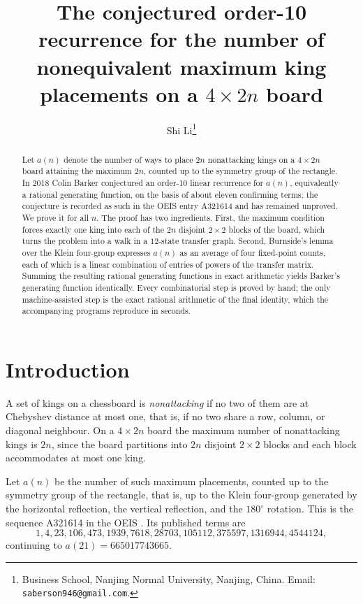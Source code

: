\documentclass[12pt]{article}
\theoremstyle{definition}
\begin{document}
\title{The conjectured order-10 recurrence for the number of
nonequivalent maximum king placements on a $4 \times 2n$ board}

\author{Shi Li\thanks{Business School, Nanjing Normal University, Nanjing,
China. Email: \texttt{saberson946@gmail.com}.}}

\date{}

\maketitle

\begin{abstract}
Let $a(n)$ denote the number of ways to place $2n$ nonattacking kings on a
$4 \times 2n$ board attaining the maximum $2n$, counted up to the symmetry
group of the rectangle. In 2018 Colin Barker conjectured an order-10 linear
recurrence for $a(n)$, equivalently a rational generating function, on the
basis of about eleven confirming terms; the conjecture is recorded as such in
the OEIS entry A321614 and has remained unproved. We prove it for all $n$. The
proof has two ingredients. First, the maximum condition forces exactly one king
into each of the $2n$ disjoint $2 \times 2$ blocks of the board, which turns the
problem into a walk in a $12$-state transfer graph. Second, Burnside's lemma
over the Klein four-group expresses $a(n)$ as an average of four fixed-point
counts, each of which is a linear combination of entries of powers of the
transfer matrix. Summing the resulting rational generating functions in exact
arithmetic yields Barker's generating function identically. Every combinatorial
step is proved by hand; the only machine-assisted step is the exact rational
arithmetic of the final identity, which the accompanying programs reproduce in
seconds.
\end{abstract}

\section{Introduction}

A set of kings on a chessboard is \emph{nonattacking} if no two of them are at
Chebyshev distance at most one, that is, if no two share a row, column, or
diagonal neighbour. On a $4 \times 2n$ board the maximum number of nonattacking
kings is $2n$, since the board partitions into $2n$ disjoint $2 \times 2$ blocks
and each block accommodates at most one king.

Let $a(n)$ be the number of such maximum placements, counted up to the
symmetry group of the rectangle, that is, up to the Klein four-group generated
by the horizontal reflection, the vertical reflection, and the $180^\circ$
rotation. This is the sequence A321614 in the OEIS \cite{oeis}. Its published
terms are
\[
1, 4, 23, 106, 473, 1939, 7618, 28703, 105112, 375597, 1316944, 4544124,
\]
continuing to $a(21) = 665017743665$.
\end{document}
